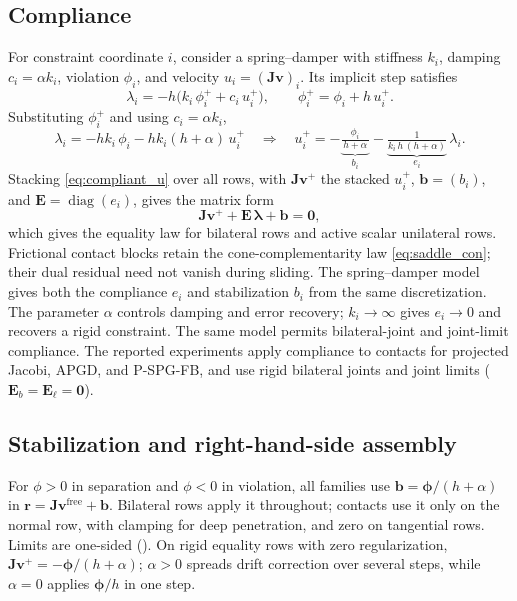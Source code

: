 \documentclass{article}
\newcommand{\Jac}{\mathbf{J}}
\newcommand{\Ecomp}{\mathbf{E}}       %
\newcommand{\vv}{\mathbf{v}}
\newcommand{\vfree}{\mathbf{v}^{\mathrm{free}}}
\newcommand{\blam}{\boldsymbol{\lambda}}
\newcommand{\bphi}{\boldsymbol{\phi}}
\newcommand{\rhs}{\mathbf{r}}
\newcommand{\stab}{\mathbf{b}}           %
\theoremstyle{plain}
\theoremstyle{definition}
\begin{document}
\subsection{Compliance}
\label{sec:compliance}
For constraint coordinate $i$, consider a spring--damper with stiffness $k_i$,
damping $c_i=\alpha k_i$, violation $\phi_i$, and velocity
$u_i=(\Jac\vv)_i$. Its implicit step satisfies
\begin{equation}
\lambda_i = -h\bigl(k_i\,\phi_i^{+}+c_i\,u_i^{+}\bigr),
\qquad
\phi_i^{+}=\phi_i+h\,u_i^{+}.
\label{eq:spring}
\end{equation}
Substituting $\phi_i^{+}$ and using $c_i=\alpha k_i$,
\begin{equation}
\lambda_i = -h k_i\,\phi_i - h k_i(h+\alpha)\,u_i^{+}
\quad\Longrightarrow\quad
u_i^{+} = -\underbrace{\tfrac{\phi_i}{\,h+\alpha\,}}_{b_i}
          -\underbrace{\tfrac{1}{k_i\,h\,(h+\alpha)}}_{e_i}\,\lambda_i .
\label{eq:compliant_u}
\end{equation}
Stacking \eqref{eq:compliant_u} over all rows, with $\Jac\vv^{+}$ the stacked
$u_i^{+}$, $\stab=(b_i)$, and $\Ecomp=\operatorname{diag}(e_i)$, gives the matrix
form
\begin{equation}
\Jac\vv^{+} + \Ecomp\,\blam + \stab = \mathbf 0 ,
\label{eq:compliant_matrix}
\end{equation}
which gives the equality law for bilateral rows and active scalar unilateral
rows. Frictional contact blocks retain the cone-complementarity law
\eqref{eq:saddle_con}; their dual residual need not vanish during sliding. The
spring--damper model gives both the compliance $e_i$ and stabilization $b_i$
from the same discretization. The parameter $\alpha$ controls damping and error
recovery; $k_i\to\infty$ gives $e_i\to0$ and recovers a rigid constraint.
The same model permits bilateral-joint and joint-limit compliance. The reported
experiments apply compliance to contacts for projected Jacobi, APGD, and
P-SPG-FB, and use rigid bilateral joints and joint limits
($\Ecomp_b=\Ecomp_\ell=\mathbf0$).

\subsection{Stabilization and right-hand-side assembly}
\label{sec:rhs}
For $\phi>0$ in separation and $\phi<0$ in violation, all families use
$\stab=\bphi/(h+\alpha)$ in $\rhs=\Jac\vfree+\stab$. Bilateral rows apply it
throughout; contacts use it only on the normal row, with clamping for deep
penetration, and zero on tangential rows. Limits are one-sided
(). On rigid equality rows with zero regularization,
$\Jac\vv^+=-\bphi/(h+\alpha)$; $\alpha>0$ spreads drift correction over several
steps, while $\alpha=0$ applies $\bphi/h$ in one step.
\end{document}

